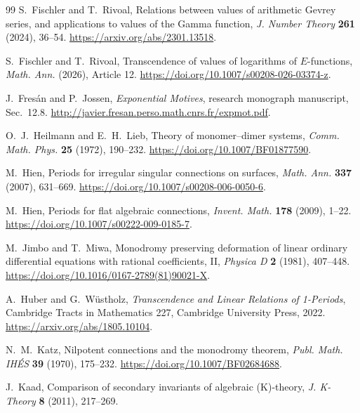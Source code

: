 \documentclass[11pt]{article}
\theoremstyle{definition}
\theoremstyle{remark}
\begin{document}
\begin{thebibliography}{99}
S.~Fischler and T.~Rivoal,
\newblock Relations between values of arithmetic Gevrey series, and
\newblock applications to values of the Gamma function,
\newblock \emph{J. Number Theory} \textbf{261} (2024), 36--54.
\newblock \url{https://arxiv.org/abs/2301.13518}.

S.~Fischler and T.~Rivoal,
\newblock Transcendence of values of logarithms of \(E\)-functions,
\newblock \emph{Math. Ann.} (2026), Article 12.
\newblock \url{https://doi.org/10.1007/s00208-026-03374-z}.

J.~Fres\'an and P.~Jossen,
\newblock \emph{Exponential Motives},
\newblock research monograph manuscript, Sec.~12.8.
\newblock \url{http://javier.fresan.perso.math.cnrs.fr/expmot.pdf}.

O.~J.~Heilmann and E.~H.~Lieb,
\newblock Theory of monomer--dimer systems,
\newblock \emph{Comm. Math. Phys.} \textbf{25} (1972), 190--232.
\newblock \url{https://doi.org/10.1007/BF01877590}.

M.~Hien,
\newblock Periods for irregular singular connections on surfaces,
\newblock \emph{Math. Ann.} \textbf{337} (2007), 631--669.
\newblock \url{https://doi.org/10.1007/s00208-006-0050-6}.

M.~Hien,
\newblock Periods for flat algebraic connections,
\newblock \emph{Invent. Math.} \textbf{178} (2009), 1--22.
\newblock \url{https://doi.org/10.1007/s00222-009-0185-7}.

M.~Jimbo and T.~Miwa,
\newblock Monodromy preserving deformation of linear ordinary differential
equations with rational coefficients, II,
\newblock \emph{Physica D} \textbf{2} (1981), 407--448.
\newblock \url{https://doi.org/10.1016/0167-2789(81)90021-X}.

A.~Huber and G.~W\"ustholz,
\newblock \emph{Transcendence and Linear Relations of 1-Periods},
\newblock Cambridge Tracts in Mathematics 227, Cambridge University Press,
2022.
\newblock \url{https://arxiv.org/abs/1805.10104}.

N.~M.~Katz,
\newblock Nilpotent connections and the monodromy theorem,
\newblock \emph{Publ. Math. IH\'ES} \textbf{39} (1970), 175--232.
\newblock \url{https://doi.org/10.1007/BF02684688}.

J.~Kaad,
\newblock Comparison of secondary invariants of algebraic (K)-theory,
\newblock \emph{J. K-Theory} \textbf{8} (2011), 217--269.


\end{thebibliography}
\end{document}
